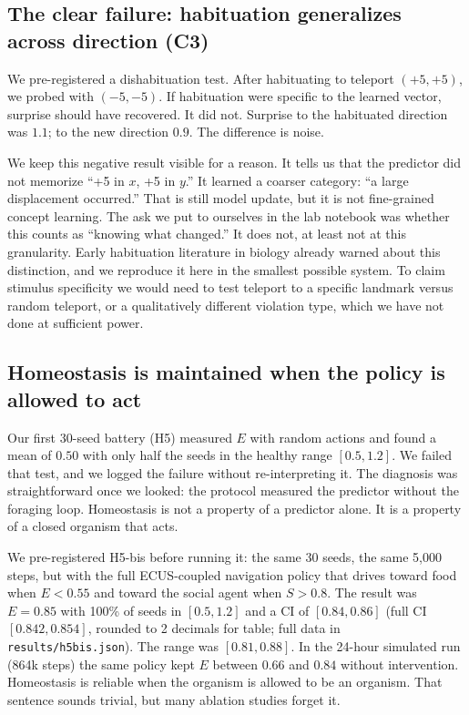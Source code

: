 \documentclass[11pt,a4paper]{article}
\begin{document}
\subsection{The clear failure: habituation generalizes across direction (C3)}

We pre-registered a dishabituation test. After habituating to teleport $(+5,+5)$, we probed with $(-5,-5)$. If habituation were specific to the learned vector, surprise should have recovered. It did not. Surprise to the habituated direction was $1.1$; to the new direction $0.9$. The difference is noise.

We keep this negative result visible for a reason. It tells us that the predictor did not memorize ``+5 in $x$, +5 in $y$.'' It learned a coarser category: ``a large displacement occurred.'' That is still model update, but it is not fine-grained concept learning. The ask we put to ourselves in the lab notebook was whether this counts as ``knowing what changed.'' It does not, at least not at this granularity. Early habituation literature in biology already warned about this distinction, and we reproduce it here in the smallest possible system. To claim stimulus specificity we would need to test teleport to a specific landmark versus random teleport, or a qualitatively different violation type, which we have not done at sufficient power.

\subsection{Homeostasis is maintained when the policy is allowed to act}

Our first 30-seed battery (H5) measured $E$ with random actions and found a mean of $0.50$ with only half the seeds in the healthy range $[0.5, 1.2]$. We failed that test, and we logged the failure without re-interpreting it. The diagnosis was straightforward once we looked: the protocol measured the predictor without the foraging loop. Homeostasis is not a property of a predictor alone. It is a property of a closed organism that acts.

We pre-registered H5-bis before running it: the same 30 seeds, the same 5,000 steps, but with the full ECUS-coupled navigation policy that drives toward food when $E<0.55$ and toward the social agent when $S>0.8$. The result was $E=0.85$ with 100\% of seeds in $[0.5,1.2]$ and a CI of $[0.84,0.86]$ (full CI $[0.842,0.854]$, rounded to 2 decimals for table; full data in \texttt{results/h5bis.json}). The range was $[0.81,0.88]$. In the 24-hour simulated run (864k steps) the same policy kept $E$ between $0.66$ and $0.84$ without intervention. Homeostasis is reliable when the organism is allowed to be an organism. That sentence sounds trivial, but many ablation studies forget it.
\end{document}
